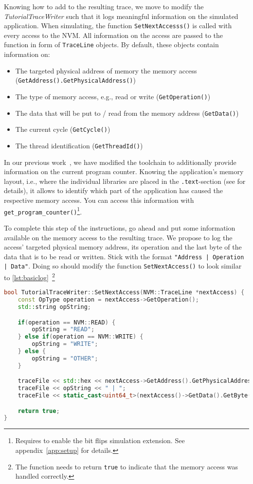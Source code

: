 Knowing how to add to the resulting trace, we move to modify the \emph{TutorialTraceWriter} such that it logs meaningful information on the simulated application. When simulating, the function \texttt{SetNextAccesss()} is called with every access to the NVM. All information on the access are passed to the function in form of \texttt{TraceLine} objects. By default, these objects contain information on:
\begin{itemize}
    \item The targeted physical address of memory the memory access (\texttt{GetAddress().GetPhysicalAddress()})
    \item The type of memory access, e.g., read or write (\texttt{GetOperation()})
    \item The data that will be put to / read from the memory address (\texttt{GetData()})
    \item The current cycle (\texttt{GetCycle()})
    \item The thread identification (\texttt{GetThreadId()})
\end{itemize}
In our previous work~\cite{hakert:2020:split}, we have modified the toolchain to additionally provide information on the current program counter. Knowing the application's memory layout, i.e., where the individual libraries are placed in the \texttt{.text}-section (see \cite{hakert:2020:split} for details), it allows to identify which part of the application has caused the respective memory access. You can access this information with \texttt{get\_program\_counter()}\footnote{
Requires to enable the bit flips simulation extension. See appendix~\cref{app:setup} for details.
}.

To complete this step of the instructions, go ahead and put some information available on the memory access to the resulting trace. We propose to log the access' targeted physical memory address, its operation and the last byte of the data that is to be read or written. Stick with the format \texttt{"Address | Operation | Data"}. Doing so should modify the function \texttt{SetNextAccess()} to look similar to \cref{lst:basiclog}~\footnote{
The function needs to return \texttt{true} to indicate that the memory access was handled correctly.
}

\begin{lstlisting}[caption={Basic TraceLine Logging},label=lst:basiclog,language=c++,basicstyle=\ttfamily\scriptsize]
bool TutorialTraceWriter::SetNextAccess(NVM::TraceLine *nextAccess) {
    const OpType operation = nextAccess->GetOperation();
    std::string opString;

    if(operation == NVM::READ) {
        opString = "READ";
    } else if(operation == NVM::WRITE) {
        opString = "WRITE";
    } else {
        opString = "OTHER";
    }

    traceFile << std::hex << nextAccess->GetAddress().GetPhysicalAddress() << std::dec << " | ";
    traceFile << opString << " | ";
    traceFile << static_cast<uint64_t>(nextAccess()->GetData().GetByte(0));

    return true;
}
\end{lstlisting}

